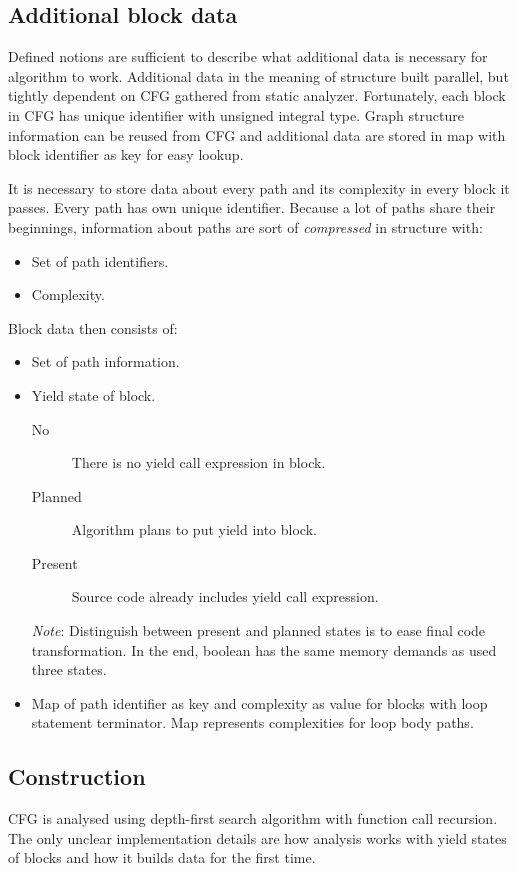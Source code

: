 \subsection{Additional block data}
Defined notions are sufficient to describe what additional data is necessary for algorithm to work. Additional data in the meaning of structure built parallel, but tightly dependent on CFG gathered from static analyzer. Fortunately, each block in CFG has unique identifier with unsigned integral type. Graph structure information can be reused from CFG and additional data are stored in map with block identifier as key for easy lookup.

It is necessary to store data about every path and its complexity in every block it passes. Every path has own unique identifier. Because a lot of paths share their beginnings, information about paths are sort of \emph{compressed} in structure with:
\begin{itemize}
\item{Set of path identifiers.}
\item{Complexity.}
\end{itemize}
Block data then consists of:
\begin{itemize}
\item{Set of path information.}
\item{Yield state of block.}
	\begin{description}
	\item[No]{There is no yield call expression in block.}
	\item[Planned]{Algorithm plans to put yield into block.}
	\item[Present]{Source code already includes yield call expression.}
	\end{description}
	\emph{Note}: Distinguish between present and planned states is to ease final code transformation. In the end, boolean has the same memory demands as used three states.
\item{Map of path identifier as key and complexity as value for blocks with loop statement terminator. Map represents complexities for loop body paths.}
\end{itemize}

\subsection{Construction}
CFG is analysed using depth-first search algorithm with function call recursion. The only unclear implementation details are how analysis works with yield states of blocks and how it builds data for the first time.

